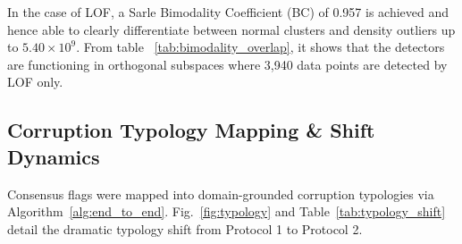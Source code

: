 \documentclass[conference]{IEEEtran}
\begin{document}
\begin{table}[htbp]
\centering
\caption{Score Distribution Bimodality and Subspace Overlap Matrix}
\label{tab:bimodality_overlap}
\setlength{\tabcolsep}{2.5pt}
\end{table}

In the case of LOF, a Sarle Bimodality Coefficient (BC) of 0.957 is achieved and hence able to clearly differentiate between normal clusters and density outliers up to $5.40 \times 10^9$. From table ~\ref{tab:bimodality_overlap}, it shows that the detectors are functioning in orthogonal subspaces where 3,940 data points are detected by LOF only.


\subsection{Corruption Typology Mapping \& Shift Dynamics}

Consensus flags were mapped into domain-grounded corruption typologies via Algorithm~\ref{alg:end_to_end}. Fig.~\ref{fig:typology} and Table~\ref{tab:typology_shift} detail the dramatic typology shift from Protocol 1 to Protocol 2.
\end{document}
